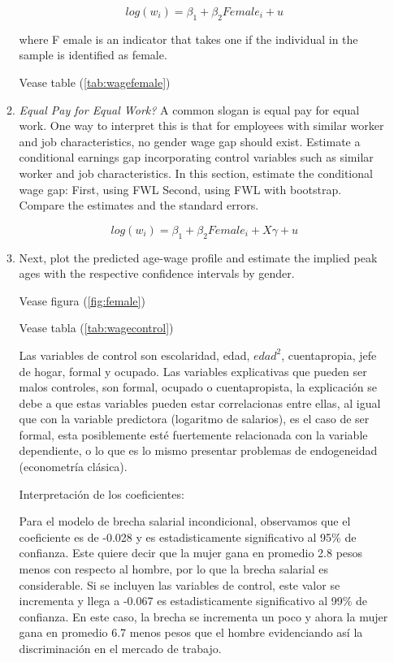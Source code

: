 \documentclass[12pt,a4paper,onecolumn]{article}
\begin{document}
\begin{enumerate}
\begin{enumerate}
    \begin{equation}
    log(w_{i}) = \beta_{1} +\beta_{2}Female_{i}  + u
    \end{equation}

    where F emale is an indicator that takes one if the individual in the sample is identified as female.

     Vease table (\ref{tab:wagefemale}) 



    
    \item \textit{Equal Pay for Equal Work?} A common slogan is equal pay for equal work. One way to interpret this is that for employees with similar worker and job characteristics, no gender wage gap should exist. Estimate a conditional earnings gap incorporating control variables such as similar worker and job characteristics. In this section, estimate the conditional wage gap:
    First, using FWL
    Second, using FWL with bootstrap. Compare the estimates and the standard errors.
    

  \begin{equation}
    log(w_{i}) = \beta_{1} +\beta_{2}Female_{i} + X\gamma + u 
    \end{equation}



    \item Next, plot the predicted age-wage profile and estimate the implied peak ages with the respective confidence intervals by gender.

    Vease figura (\ref{fig:female}) 
    
     Vease tabla (\ref{tab:wagecontrol}) 

     Las variables de control son escolaridad, edad, $edad^{2}$, cuentapropia, jefe de hogar, formal y ocupado. Las variables explicativas que pueden ser malos controles, son formal, ocupado o cuentapropista, la explicaci\'on se debe a que estas variables pueden estar correlacionas entre ellas, al igual que con la variable predictora (logaritmo de salarios), es el caso de ser formal, esta posiblemente est\'e fuertemente relacionada con la variable dependiente, o lo que es lo mismo presentar problemas de endogeneidad (econometr\'ia cl\'asica).

     Interpretaci\'on de los coeficientes:

     Para el modelo de brecha salarial incondicional, observamos que el coeficiente es de -0.028 y es estadisticamente significativo al 95\% de confianza. Este quiere decir que la mujer gana en promedio 2.8 pesos menos con respecto al hombre, por lo que la brecha salarial es considerable. Si se incluyen las variables de control, este valor se incrementa y llega a -0.067 es estadisticamente significativo al 99\% de confianza. En este caso, la brecha se incrementa un poco y ahora la mujer gana en promedio 6.7 menos pesos que el hombre evidenciando así la discriminaci\'on en el mercado de trabajo.


\end{enumerate}
\end{enumerate}
\end{document}
